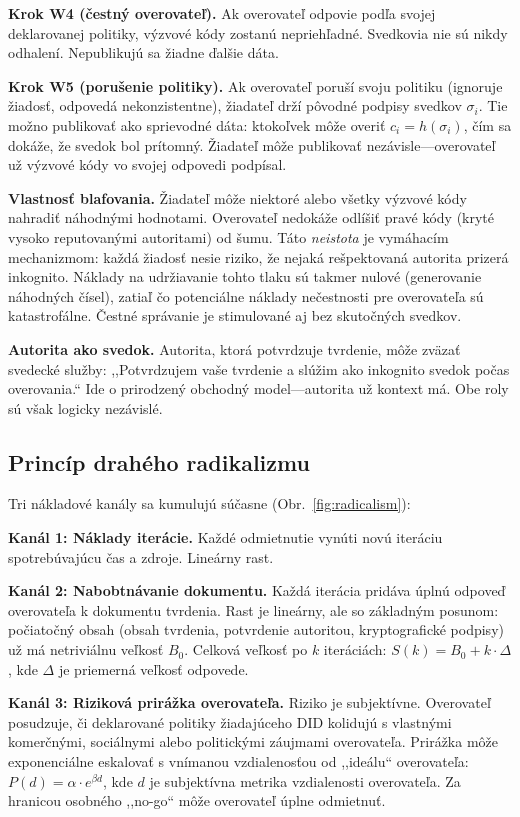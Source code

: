 \documentclass[11pt,a4paper,twocolumn]{article}
\begin{document}
\textbf{Krok W4 (čestný overovateľ).} Ak overovateľ odpovie podľa svojej deklarovanej politiky, výzvové kódy zostanú nepriehľadné. Svedkovia nie sú nikdy odhalení. Nepublikujú sa žiadne ďalšie dáta.

\textbf{Krok W5 (porušenie politiky).} Ak overovateľ poruší svoju politiku (ignoruje žiadosť, odpovedá nekonzistentne), žiadateľ drží pôvodné podpisy svedkov $\sigma_i$. Tie možno publikovať ako sprievodné dáta: ktokoľvek môže overiť $c_i = h(\sigma_i)$, čím sa dokáže, že svedok bol prítomný. Žiadateľ môže publikovať nezávisle---overovateľ už výzvové kódy vo svojej odpovedi podpísal.

\textbf{Vlastnosť blafovania.} Žiadateľ môže niektoré alebo všetky výzvové kódy nahradiť náhodnými hodnotami. Overovateľ nedokáže odlíšiť pravé kódy (kryté vysoko reputovanými autoritami) od šumu. Táto \emph{neistota} je vymáhacím mechanizmom: každá žiadosť nesie riziko, že nejaká rešpektovaná autorita prizerá inkognito. Náklady na udržiavanie tohto tlaku sú takmer nulové (generovanie náhodných čísel), zatiaľ čo potenciálne náklady nečestnosti pre overovateľa sú katastrofálne. Čestné správanie je stimulované aj bez skutočných svedkov.

\textbf{Autorita ako svedok.} Autorita, ktorá potvrdzuje tvrdenie, môže zväzať svedecké služby: ,,Potvrdzujem vaše tvrdenie a slúžim ako inkognito svedok počas overovania.`` Ide o prirodzený obchodný model---autorita už kontext má. Obe roly sú však logicky nezávislé.

\subsection{Princíp drahého radikalizmu}

Tri nákladové kanály sa kumulujú súčasne (Obr.~\ref{fig:radicalism}):

\textbf{Kanál 1: Náklady iterácie.} Každé odmietnutie vynúti novú iteráciu spotrebúvajúcu čas a zdroje. Lineárny rast.

\textbf{Kanál 2: Nabobtnávanie dokumentu.} Každá iterácia pridáva úplnú odpoveď overovateľa k dokumentu tvrdenia. Rast je lineárny, ale so základným posunom: počiatočný obsah (obsah tvrdenia, potvrdenie autoritou, kryptografické podpisy) už má netriviálnu veľkosť $B_0$. Celková veľkosť po $k$ iteráciách: $S(k) = B_0 + k \cdot \Delta$, kde $\Delta$ je priemerná veľkosť odpovede.

\textbf{Kanál 3: Riziková prirážka overovateľa.} Riziko je subjektívne. Overovateľ posudzuje, či deklarované politiky žiadajúceho DID kolidujú s vlastnými komerčnými, sociálnymi alebo politickými záujmami overovateľa. Prirážka môže exponenciálne eskalovať s vnímanou vzdialenosťou od ,,ideálu`` overovateľa: $P(d) = \alpha \cdot e^{\beta d}$, kde $d$ je subjektívna metrika vzdialenosti overovateľa. Za hranicou osobného ,,no-go`` môže overovateľ úplne odmietnuť.
\end{document}
